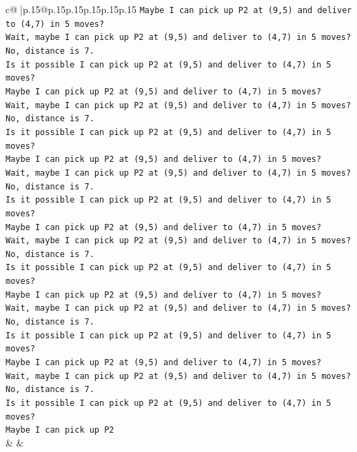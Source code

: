 \documentclass{article}
\begin{document}
{\begin{supertabular}{c@{$\;$}|p{.15\linewidth}@{}p{.15\linewidth}p{.15\linewidth}p{.15\linewidth}p{.15\linewidth}p{.15\linewidth}}
{{{\texttt{Maybe I can pick up P2 at (9,5) and deliver to (4,7) in 5 moves?} \\
\texttt{Wait, maybe I can pick up P2 at (9,5) and deliver to (4,7) in 5 moves?} \\
\texttt{No, distance is 7.} \\
\texttt{Is it possible I can pick up P2 at (9,5) and deliver to (4,7) in 5 moves?} \\
\texttt{Maybe I can pick up P2 at (9,5) and deliver to (4,7) in 5 moves?} \\
\texttt{Wait, maybe I can pick up P2 at (9,5) and deliver to (4,7) in 5 moves?} \\
\texttt{No, distance is 7.} \\
\texttt{Is it possible I can pick up P2 at (9,5) and deliver to (4,7) in 5 moves?} \\
\texttt{Maybe I can pick up P2 at (9,5) and deliver to (4,7) in 5 moves?} \\
\texttt{Wait, maybe I can pick up P2 at (9,5) and deliver to (4,7) in 5 moves?} \\
\texttt{No, distance is 7.} \\
\texttt{Is it possible I can pick up P2 at (9,5) and deliver to (4,7) in 5 moves?} \\
\texttt{Maybe I can pick up P2 at (9,5) and deliver to (4,7) in 5 moves?} \\
\texttt{Wait, maybe I can pick up P2 at (9,5) and deliver to (4,7) in 5 moves?} \\
\texttt{No, distance is 7.} \\
\texttt{Is it possible I can pick up P2 at (9,5) and deliver to (4,7) in 5 moves?} \\
\texttt{Maybe I can pick up P2 at (9,5) and deliver to (4,7) in 5 moves?} \\
\texttt{Wait, maybe I can pick up P2 at (9,5) and deliver to (4,7) in 5 moves?} \\
\texttt{No, distance is 7.} \\
\texttt{Is it possible I can pick up P2 at (9,5) and deliver to (4,7) in 5 moves?} \\
\texttt{Maybe I can pick up P2 at (9,5) and deliver to (4,7) in 5 moves?} \\
\texttt{Wait, maybe I can pick up P2 at (9,5) and deliver to (4,7) in 5 moves?} \\
\texttt{No, distance is 7.} \\
\texttt{Is it possible I can pick up P2 at (9,5) and deliver to (4,7) in 5 moves?} \\
\texttt{Maybe I can pick up P2} \\
            }
        }
    }
    & & \\ \\


\end{supertabular}}
\end{document}
